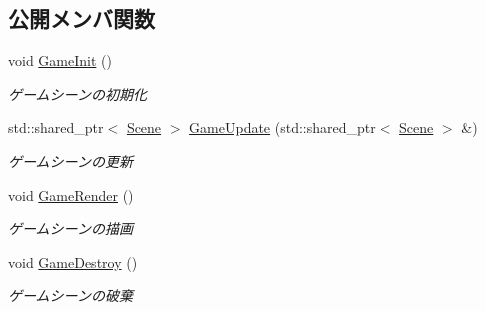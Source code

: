 \subsection*{公開メンバ関数}
\begin{DoxyCompactItemize}
\item 
void \mbox{\hyperlink{class_game_scene_base_ab37608f861866bd183801326214d0e92}{Game\+Init}} ()
\begin{DoxyCompactList}\small\item\em ゲームシーンの初期化 \end{DoxyCompactList}\item 
std\+::shared\+\_\+ptr$<$ \mbox{\hyperlink{class_scene}{Scene}} $>$ \mbox{\hyperlink{class_game_scene_base_ae9dab92c5cb057a884d12d21fe823fd9}{Game\+Update}} (std\+::shared\+\_\+ptr$<$ \mbox{\hyperlink{class_scene}{Scene}} $>$ \&)
\begin{DoxyCompactList}\small\item\em ゲームシーンの更新 \end{DoxyCompactList}\item 
void \mbox{\hyperlink{class_game_scene_base_acc15e7fb83c2403c2a5e65fa64ca8cb3}{Game\+Render}} ()
\begin{DoxyCompactList}\small\item\em ゲームシーンの描画 \end{DoxyCompactList}\item 
void \mbox{\hyperlink{class_game_scene_base_a8105804f1a8d6d59d4278d00142680a0}{Game\+Destroy}} ()
\begin{DoxyCompactList}\small\item\em ゲームシーンの破棄 \end{DoxyCompactList}\end{DoxyCompactItemize}
